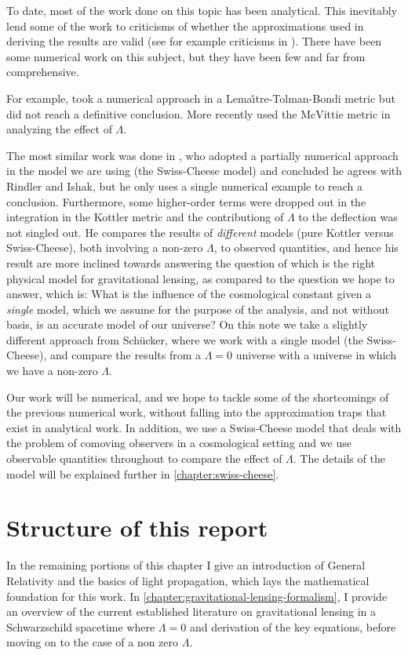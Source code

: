 To date, most of the work done on this topic has been analytical. This inevitably lend some of the work to criticisms of whether the approximations used in deriving the results are valid (see for example criticisms in \citet{ishak2010more}). There have been some numerical work on this subject, but they have been few and far from comprehensive. 

For example, \citet{beynon2012testing} took a numerical approach in a Lema{\^\i}tre-Tolman-Bondi metric \citep{lemaitre1997expanding,tolman1934effect,bondi1947spherically} but did not reach a definitive conclusion. More recently \citep{aghili2017effect} used the McVittie metric \citep{mcvittie1933mass} in analyzing the effect of $\Lambda$. 

The most similar work was done in \citet{schucker2009strong}, who adopted a partially numerical approach in the model we are using (the Swiss-Cheese model) and concluded he agrees with Rindler and Ishak, but he only uses a single numerical example to reach a conclusion. Furthermore, some higher-order terms were dropped out in the integration in the Kottler metric and the contributiong of $\Lambda$ to the deflection was not singled out. He compares the results of \emph{different} models (pure Kottler versus Swiss-Cheese), both involving a non-zero $\Lambda$, to observed quantities, and hence his result are more inclined towards answering the question of which is the right physical model for gravitational lensing, as compared to the question we hope to answer, which is: What is the influence of the cosmological constant given a \emph{single} model, which we assume for the purpose of the analysis, and not without basis, is an accurate model of our universe? On this note we take a slightly different approach from Sch{\"u}cker, where we work with a single model (the Swiss-Cheese), and compare the results from a $\Lambda = 0$ universe with a universe in which we have a non-zero $\Lambda$. 

Our work will be numerical, and we hope to tackle some of the shortcomings of the previous numerical work, without falling into the approximation traps that exist in analytical work. In addition, we use a Swiss-Cheese model that deals with the problem of comoving observers in a cosmological setting and we use observable quantities throughout to compare the effect of $\Lambda$. The details of the model will be explained further in \autoref{chapter:swiss-cheese}.

\section{Structure of this report}
In the remaining portions of this chapter I give an introduction of General Relativity and the basics of light propagation, which lays the mathematical foundation for this work. In \autoref{chapter:gravitational-lensing-formalism}, I provide an overview of the current established literature on gravitational lensing in a Schwarzschild spacetime where $\Lambda = 0$ and derivation of the key equations, before moving on to the case of a non zero $\Lambda$. 


